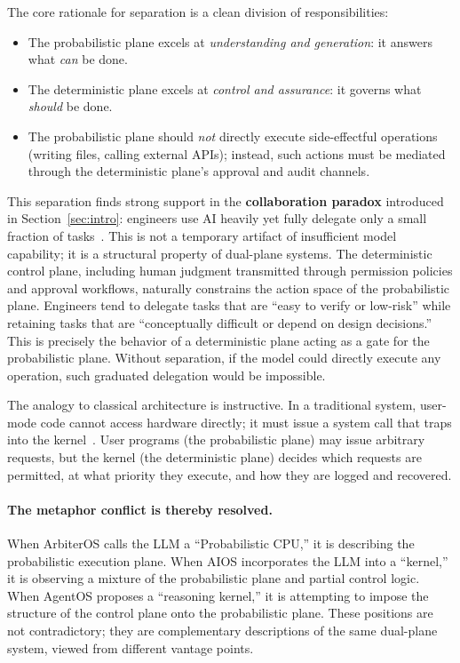 The core rationale for separation is a clean division of responsibilities:
\begin{itemize}[nosep]
\item The probabilistic plane excels at \textit{understanding and generation}: it answers what \emph{can} be done.
\item The deterministic plane excels at \textit{control and assurance}: it governs what \emph{should} be done.
\item The probabilistic plane should \textit{not} directly execute side-effectful operations (writing files, calling external APIs); instead, such actions must be mediated through the deterministic plane's approval and audit channels.
\end{itemize}

This separation finds strong support in the \textbf{collaboration paradox} introduced in Section~\ref{sec:intro}: engineers use AI heavily yet fully delegate only a small fraction of tasks~\cite{anthropic2026agenticreport}.
This is not a temporary artifact of insufficient model capability; it is a structural property of dual-plane systems.
The deterministic control plane, including human judgment transmitted through permission policies and approval workflows, naturally constrains the action space of the probabilistic plane.
Engineers tend to delegate tasks that are ``easy to verify or low-risk'' while retaining tasks that are ``conceptually difficult or depend on design decisions.''
This is precisely the behavior of a deterministic plane acting as a gate for the probabilistic plane.
Without separation, if the model could directly execute any operation, such graduated delegation would be impossible.

The analogy to classical architecture is instructive.
In a traditional system, user-mode code cannot access hardware directly; it must issue a system call that traps into the kernel~\cite{ostep_2023}.
User programs (the probabilistic plane) may issue arbitrary requests, but the kernel (the deterministic plane) decides which requests are permitted, at what priority they execute, and how they are logged and recovered.

\paragraph{The metaphor conflict is thereby resolved.}
When ArbiterOS calls the LLM a ``Probabilistic CPU,'' it is describing the probabilistic execution plane.
When AIOS incorporates the LLM into a ``kernel,'' it is observing a mixture of the probabilistic plane and partial control logic.
When AgentOS proposes a ``reasoning kernel,'' it is attempting to impose the structure of the control plane onto the probabilistic plane.
These positions are not contradictory; they are complementary descriptions of the same dual-plane system, viewed from different vantage points.

